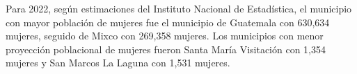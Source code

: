 Para 2022, según estimaciones del Instituto Nacional de Estadística, el municipio con mayor población de mujeres fue el municipio de Guatemala con 630,634 mujeres, seguido de Mixco con 269,358 mujeres. Los municipios con menor proyección poblacional de mujeres fueron Santa María Visitación con 1,354 mujeres y San Marcos La Laguna con 1,531 mujeres.  